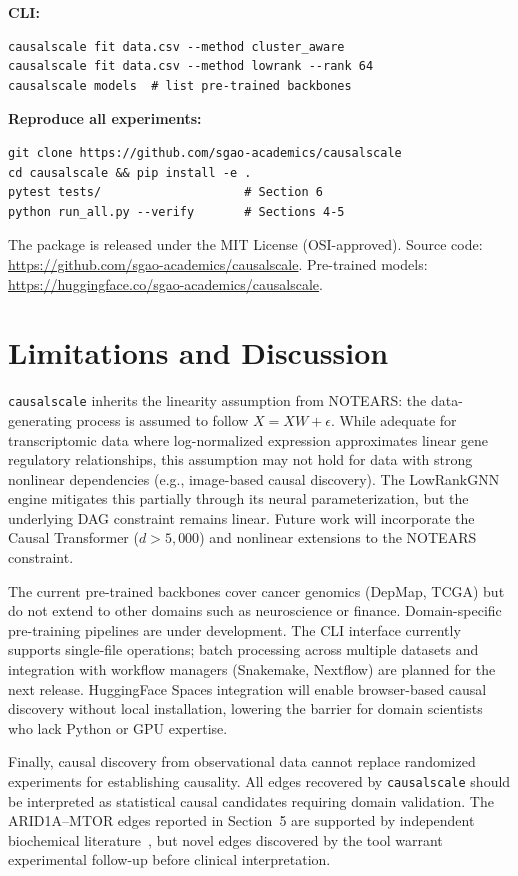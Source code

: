 \documentclass[sigconf,review]{acmart}
\begin{document}
\textbf{CLI:}
\begin{verbatim}
causalscale fit data.csv --method cluster_aware
causalscale fit data.csv --method lowrank --rank 64
causalscale models  # list pre-trained backbones
\end{verbatim}

\textbf{Reproduce all experiments:}
\begin{verbatim}
git clone https://github.com/sgao-academics/causalscale
cd causalscale && pip install -e .
pytest tests/                    # Section 6
python run_all.py --verify       # Sections 4-5
\end{verbatim}

The package is released under the MIT License (OSI-approved). Source code: \url{https://github.com/sgao-academics/causalscale}. Pre-trained models: \url{https://huggingface.co/sgao-academics/causalscale}.

\section{Limitations and Discussion}

\texttt{causalscale} inherits the linearity assumption from NOTEARS: the data-generating process is assumed to follow $X = XW + \epsilon$. While adequate for transcriptomic data where log-normalized expression approximates linear gene regulatory relationships, this assumption may not hold for data with strong nonlinear dependencies (e.g., image-based causal discovery). The LowRankGNN engine mitigates this partially through its neural parameterization, but the underlying DAG constraint remains linear. Future work will incorporate the Causal Transformer ($d>5{,}000$) and nonlinear extensions to the NOTEARS constraint.

The current pre-trained backbones cover cancer genomics (DepMap, TCGA) but do not extend to other domains such as neuroscience or finance. Domain-specific pre-training pipelines are under development. The CLI interface currently supports single-file operations; batch processing across multiple datasets and integration with workflow managers (Snakemake, Nextflow) are planned for the next release. HuggingFace Spaces integration will enable browser-based causal discovery without local installation, lowering the barrier for domain scientists who lack Python or GPU expertise.

Finally, causal discovery from observational data cannot replace randomized experiments for establishing causality. All edges recovered by \texttt{causalscale} should be interpreted as statistical causal candidates requiring domain validation. The ARID1A--MTOR edges reported in Section~5 are supported by independent biochemical literature~\cite{chandler2015coexistent,zhang2023mTOR}, but novel edges discovered by the tool warrant experimental follow-up before clinical interpretation.
\end{document}
